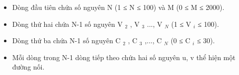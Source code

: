 \begin{itemize}
	\item Dòng đầu tiên chứa số nguyên N (1 ≤ N ≤ 100) và M (0 ≤ M ≤ 2000).
	\item Dòng thứ hai chứa N-1 số nguyên V $_ 2 $ , V $_ 3 $ ..., V $_ N $ (1 ≤ V $_ i $ ≤ 100).
	\item Dòng thứ ba chứa N-1 số nguyên C $_ 2 $ , C $_ 3 $ ,..., C $_ N $ (0 ≤ C $_ i $ ≤ 30).
	\item Mỗi dòng trong N-1 dòng tiếp theo chứa hai số nguyên u, v thể hiện một đường nối.
\end{itemize}